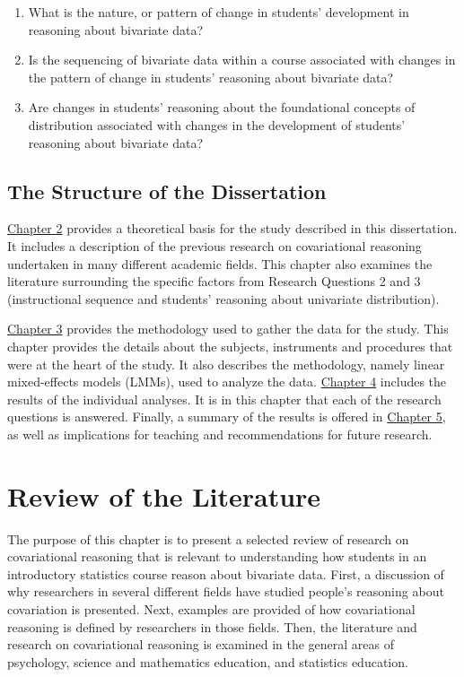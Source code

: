 \documentclass[11pt]{umnthesis}
\begin{document}
\begin{enumerate}
\def\labelenumi{\arabic{enumi}.}
\tightlist
\item
  What is the nature, or pattern of change in students' development in reasoning about bivariate data?
\item
  Is the sequencing of bivariate data within a course associated with changes in the pattern of change in students' reasoning about bivariate data?
\item
  Are changes in students' reasoning about the foundational concepts of distribution associated with changes in the development of students' reasoning about bivariate data?
\end{enumerate}

\hypertarget{the-structure-of-the-dissertation}{%
\section{The Structure of the Dissertation}\label{the-structure-of-the-dissertation}}

\protect\hyperlink{litreview}{Chapter 2} provides a theoretical basis for the study described in this dissertation. It includes a description of the previous research on covariational reasoning undertaken in many different academic fields. This chapter also examines the literature surrounding the specific factors from Research Questions 2 and 3 (instructional sequence and students' reasoning about univariate distribution).

\protect\hyperlink{methods}{Chapter 3} provides the methodology used to gather the data for the study. This chapter provides the details about the subjects, instruments and procedures that were at the heart of the study. It also describes the methodology, namely linear mixed-effects models (LMMs), used to analyze the data. \protect\hyperlink{results}{Chapter 4} includes the results of the individual analyses. It is in this chapter that each of the research questions is answered. Finally, a summary of the results is offered in \protect\hyperlink{discussion}{Chapter 5}, as well as implications for teaching and recommendations for future research.

\hypertarget{litreview}{%
\chapter{Review of the Literature}\label{litreview}}

The purpose of this chapter is to present a selected review of research on covariational reasoning that is relevant to understanding how students in an introductory statistics course reason about bivariate data. First, a discussion of why researchers in several different fields have studied people's reasoning about covariation is presented. Next, examples are provided of how covariational reasoning is defined by researchers in those fields. Then, the literature and research on covariational reasoning is examined in the general areas of psychology, science and mathematics education, and statistics education.
\end{document}
